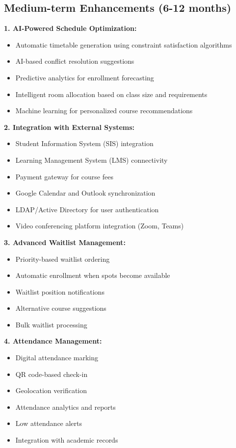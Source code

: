 \subsection{Medium-term Enhancements (6-12 months)}

\textbf{1. AI-Powered Schedule Optimization:}
\begin{itemize}
    \item Automatic timetable generation using constraint satisfaction algorithms
    \item AI-based conflict resolution suggestions
    \item Predictive analytics for enrollment forecasting
    \item Intelligent room allocation based on class size and requirements
    \item Machine learning for personalized course recommendations
\end{itemize}

\textbf{2. Integration with External Systems:}
\begin{itemize}
    \item Student Information System (SIS) integration
    \item Learning Management System (LMS) connectivity
    \item Payment gateway for course fees
    \item Google Calendar and Outlook synchronization
    \item LDAP/Active Directory for user authentication
    \item Video conferencing platform integration (Zoom, Teams)
\end{itemize}

\textbf{3. Advanced Waitlist Management:}
\begin{itemize}
    \item Priority-based waitlist ordering
    \item Automatic enrollment when spots become available
    \item Waitlist position notifications
    \item Alternative course suggestions
    \item Bulk waitlist processing
\end{itemize}

\textbf{4. Attendance Management:}
\begin{itemize}
    \item Digital attendance marking
    \item QR code-based check-in
    \item Geolocation verification
    \item Attendance analytics and reports
    \item Low attendance alerts
    \item Integration with academic records
\end{itemize}

